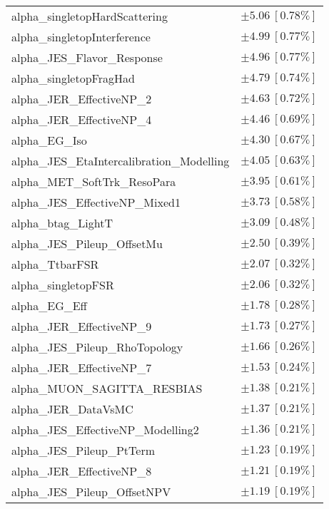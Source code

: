 \begin{table}
\begin{center}
\begin{tabular*}{\textwidth}{@{\extracolsep{\fill}}lc}
alpha\_singletopHardScattering         & $\pm 5.06\ [0.78\%] $       \\
alpha\_singletopInterference         & $\pm 4.99\ [0.77\%] $       \\
alpha\_JES\_Flavor\_Response         & $\pm 4.96\ [0.77\%] $       \\
alpha\_singletopFragHad         & $\pm 4.79\ [0.74\%] $       \\
alpha\_JER\_EffectiveNP\_2         & $\pm 4.63\ [0.72\%] $       \\
alpha\_JER\_EffectiveNP\_4         & $\pm 4.46\ [0.69\%] $       \\
alpha\_EG\_Iso         & $\pm 4.30\ [0.67\%] $       \\
alpha\_JES\_EtaIntercalibration\_Modelling         & $\pm 4.05\ [0.63\%] $       \\
alpha\_MET\_SoftTrk\_ResoPara         & $\pm 3.95\ [0.61\%] $       \\
alpha\_JES\_EffectiveNP\_Mixed1         & $\pm 3.73\ [0.58\%] $       \\
alpha\_btag\_LightT         & $\pm 3.09\ [0.48\%] $       \\
alpha\_JES\_Pileup\_OffsetMu         & $\pm 2.50\ [0.39\%] $       \\
alpha\_TtbarFSR         & $\pm 2.07\ [0.32\%] $       \\
alpha\_singletopFSR         & $\pm 2.06\ [0.32\%] $       \\
alpha\_EG\_Eff         & $\pm 1.78\ [0.28\%] $       \\
alpha\_JER\_EffectiveNP\_9         & $\pm 1.73\ [0.27\%] $       \\
alpha\_JES\_Pileup\_RhoTopology         & $\pm 1.66\ [0.26\%] $       \\
alpha\_JER\_EffectiveNP\_7         & $\pm 1.53\ [0.24\%] $       \\
alpha\_MUON\_SAGITTA\_RESBIAS         & $\pm 1.38\ [0.21\%] $       \\
alpha\_JER\_DataVsMC         & $\pm 1.37\ [0.21\%] $       \\
alpha\_JES\_EffectiveNP\_Modelling2         & $\pm 1.36\ [0.21\%] $       \\
alpha\_JES\_Pileup\_PtTerm         & $\pm 1.23\ [0.19\%] $       \\
alpha\_JER\_EffectiveNP\_8         & $\pm 1.21\ [0.19\%] $       \\
alpha\_JES\_Pileup\_OffsetNPV         & $\pm 1.19\ [0.19\%] $       \\

\end{tabular*}
\end{center}
\end{table}
